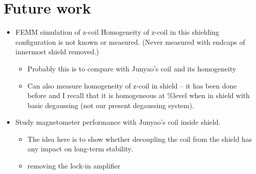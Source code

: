 \documentclass[12pt]{report}
\begin{document}
\section{Future work}
\begin{itemize}
\item	FEMM simulation of z-coil 	Homogeneity of z-coil in this shielding configuration is not known or measured.  (Never measured with endcaps of innermost shield removed.)
\begin{itemize}
\item Probably this is to compare with Junyao’s coil and its homogeneity

\item
Can also measure homogeneity of z-coil in shield – it has been done before and I recall that it is homogeneous at $\% $level when in shield with basic degaussing (not our present degaussing system).
\end{itemize}
\item
Study magnetometer performance with Junyao's coil inside shield. 
\begin{itemize}
\item	The idea here is to show whether decoupling the coil from the shield has any impact on long-term stability.
 \item removing the lock-in amplifier
\end{itemize}
\end{itemize}
\newpage
\printbibliography
\end{document}
